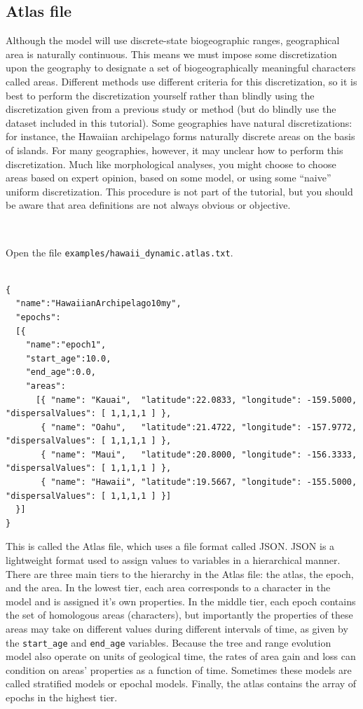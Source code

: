 \documentclass[11pt]{article}
\newcommand{\impmark}{\strut\vadjust{\domark}}
\newcommand{\domark}{%
  \vbox to 0pt{
    \kern-\dp\strutbox
    \smash{\llap{$\rightarrow$\kern1em}}
    \vss
  }%
}
\begin{document}
\subsection{Atlas file}

Although the model will use discrete-state biogeographic ranges, geographical area is naturally continuous.
This means we must impose some discretization upon the geography to designate a set of biogeographically meaningful characters called areas.
Different methods use different criteria for this discretization, so it is best to perform the discretization yourself rather than blindly using the discretization given from a previous study or method (but do blindly use the dataset included in this tutorial).
Some geographies have natural discretizations: for instance, the Hawaiian archipelago forms naturally discrete areas on the basis of islands.
For many geographies, however, it may unclear how to perform this discretization.
Much like morphological analyses, you might choose to choose areas based on expert opinion, based on some model, or using some ``naive'' uniform discretization.
This procedure is not part of the tutorial, but you should be aware that area definitions are not always obvious or objective.

\noindent \\ \impmark  Open the file \texttt{examples/hawaii\_dynamic.atlas.txt}.

\begin{framed}
\begin{lstlisting}

{
  "name":"HawaiianArchipelago10my",
  "epochs":
  [{
    "name":"epoch1",
    "start_age":10.0,
    "end_age":0.0,
    "areas":
      [{ "name": "Kauai",  "latitude":22.0833, "longitude": -159.5000, "dispersalValues": [ 1,1,1,1 ] },
       { "name": "Oahu",   "latitude":21.4722, "longitude": -157.9772, "dispersalValues": [ 1,1,1,1 ] },
       { "name": "Maui",   "latitude":20.8000, "longitude": -156.3333, "dispersalValues": [ 1,1,1,1 ] },
       { "name": "Hawaii", "latitude":19.5667, "longitude": -155.5000, "dispersalValues": [ 1,1,1,1 ] }]
  }]
}
\end{lstlisting}
\end{framed}

This is called the Atlas file, which uses a file format called JSON.
JSON is a lightweight format used to assign values to variables in a hierarchical manner.
There are three main tiers to the hierarchy in the Atlas file: the atlas, the epoch, and the area.
In the lowest tier, each area corresponds to a character in the model and is assigned it's own properties.
In the middle tier, each epoch contains the set of homologous areas (characters), but importantly the properties of these areas may take on different values during different intervals of time, as given by the {\tt start_age} and {\tt end_age} variables.
Because the tree and range evolution model also operate on units of geological time, the rates of area gain and loss can condition on areas' properties as a function of time.
Sometimes these models are called stratified models or epochal models.
Finally, the atlas contains the array of epochs in the highest tier.
\end{document}

